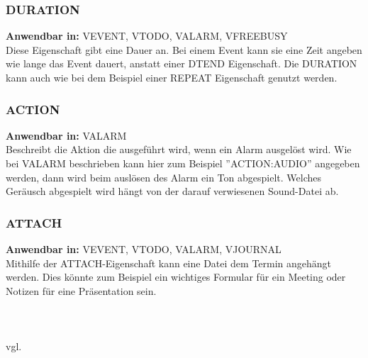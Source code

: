 \subsubsection{DURATION}
\label{sec:duration}
\textbf{Anwendbar in:} VEVENT, VTODO, VALARM, VFREEBUSY\\
Diese Eigenschaft gibt eine Dauer an. Bei einem Event kann sie eine Zeit angeben wie lange das Event dauert, anstatt einer DTEND Eigenschaft. Die DURATION kann auch wie bei dem Beispiel einer REPEAT Eigenschaft genutzt werden.
\subsubsection{ACTION}
\label{sec:action}
\textbf{Anwendbar in:} VALARM \\
Beschreibt die Aktion die ausgeführt wird, wenn ein Alarm ausgelöst wird. Wie bei VALARM beschrieben kann hier zum Beispiel ''ACTION:AUDIO'' angegeben werden, dann wird beim auslösen des Alarm ein Ton abgespielt. Welches Geräusch abgespielt wird hängt von der darauf verwiesenen Sound-Datei ab.
\subsubsection{ATTACH}
\label{sec:attach}
\textbf{Anwendbar in:} VEVENT, VTODO, VALARM, VJOURNAL\\
Mithilfe der ATTACH-Eigenschaft kann eine Datei dem Termin angehängt werden. Dies könnte zum Beispiel ein wichtiges Formular für ein Meeting oder Notizen für eine Präsentation sein.
\\ \\ \\ \\
vgl. \textcite{KanzakiKeywords}
\pagebreak

